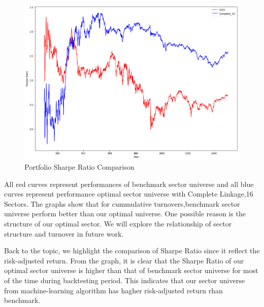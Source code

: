 \documentclass[../main.tex]{subfiles}
\begin{document}
 \begin{figure}[H]
    \centering
    \includegraphics[scale=0.4]{images/sharpe_ratio_compare.png}
    \caption{Portfolio Sharpe Ratio Comparison}
    \label{fig:benchmark_comparison:sharpe_comparison}
\end{figure}

All red curves represent performances of benchmark sector universe and all blue curves represent performance optimal sector universe with Complete Linkage,16 Sectors. The graphs show that for cummulative turnovers,benchmark sector universe perform better than our optimal universe. One possible reason is the structure of our optimal sector. We will explore the relationship of sector structure and turnover in future work. 

Back to the topic, we highlight the comparison of Sharpe Ratio since it reflect the risk-adjusted return. From the graph, it is clear that the Sharpe Ratio of our optimal sector universe is higher than that of benchmark sector universe for most of the time during backtesting period. This indicates that our sector universe from machine-learning algorithm has hagher risk-adjusted return rhan benchmark. 
\end{document}
